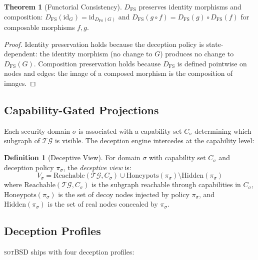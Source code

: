 \documentclass[11pt,a4paper]{article}
\theoremstyle{definition}
\newtheorem{definition}{Definition}[section]
\newtheorem{theorem}{Theorem}[section]
\theoremstyle{remark}
\newcommand{\TG}{\ensuremath{\mathcal{TG}}}
\newcommand{\sotbsd}{\textsc{sotBSD}}
\begin{document}
\begin{theorem}[Functorial Consistency]
\label{thm:functorial}
$D_{\mathrm{FS}}$ preserves identity morphisms and composition:
$D_{\mathrm{FS}}(\mathrm{id}_G) = \mathrm{id}_{D_{\mathrm{FS}}(G)}$
and $D_{\mathrm{FS}}(g \circ f) = D_{\mathrm{FS}}(g) \circ
D_{\mathrm{FS}}(f)$ for composable morphisms $f, g$.
\end{theorem}

\begin{proof}
Identity preservation holds because the deception policy is
state-dependent: the identity morphism (no change to $G$) produces
no change to $D_{\mathrm{FS}}(G)$. Composition preservation holds
because $D_{\mathrm{FS}}$ is defined pointwise on nodes and edges:
the image of a composed morphism is the composition of images.
\end{proof}

\subsection{Capability-Gated Projections}
\label{sec:deception-projections}

Each security domain $\sigma$ is associated with a capability set
$C_\sigma$ determining which subgraph of $\TG$ is visible. The
deception engine intercedes at the capability level:

\begin{definition}[Deceptive View]
\label{def:deceptive-view}
For domain $\sigma$ with capability set $C_\sigma$ and deception
policy $\pi_\sigma$, the \emph{deceptive view} is:
\[
V_\sigma = \mathrm{Reachable}(\TG, C_\sigma) \cup
  \mathrm{Honeypots}(\pi_\sigma) \setminus
  \mathrm{Hidden}(\pi_\sigma)
\]
where $\mathrm{Reachable}(\TG, C_\sigma)$ is the subgraph reachable
through capabilities in $C_\sigma$, $\mathrm{Honeypots}(\pi_\sigma)$
is the set of decoy nodes injected by policy $\pi_\sigma$, and
$\mathrm{Hidden}(\pi_\sigma)$ is the set of real nodes concealed
by $\pi_\sigma$.
\end{definition}

\subsection{Deception Profiles}
\label{sec:deception-profiles}

\sotbsd{} ships with four deception profiles:
\end{document}
